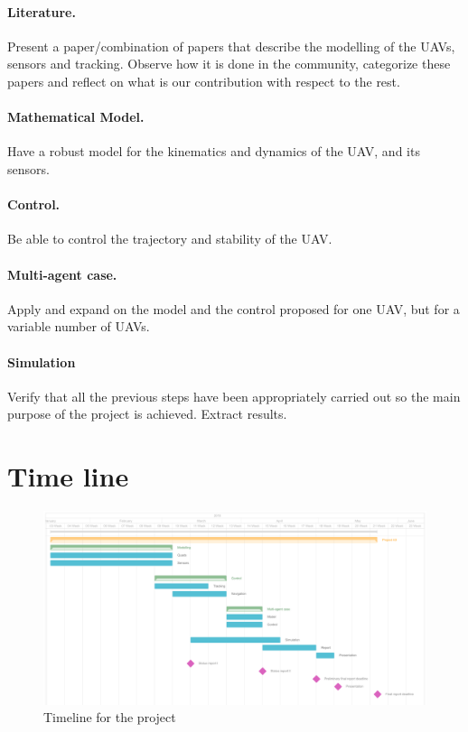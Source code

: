 \documentclass{article}
\begin{document}
		\paragraph{Literature.} Present a paper/combination of papers that describe the modelling of the UAVs, sensors and tracking. Observe how it is done in the community, categorize these papers and reflect on what is our contribution with respect to the rest. 
		
		\paragraph {Mathematical Model.} Have a robust model for the kinematics and dynamics of the UAV, and its sensors.
			
		\paragraph{Control.} Be able to control the trajectory and stability of the UAV.
			
		\paragraph{	Multi-agent case.} Apply and expand  on the model and the control proposed for one UAV, but for a variable number of UAVs.
		
		\paragraph{Simulation} Verify that all the previous steps have been appropriately carried out so the main purpose of the project is achieved. Extract results. 
		
	\section{Time line}
		\begin{figure}[H]
			\centering
			\includegraphics[width=\linewidth]{img/timeline}
			\caption{Timeline for the project}
		\end{figure}
	
	
\end{document}
